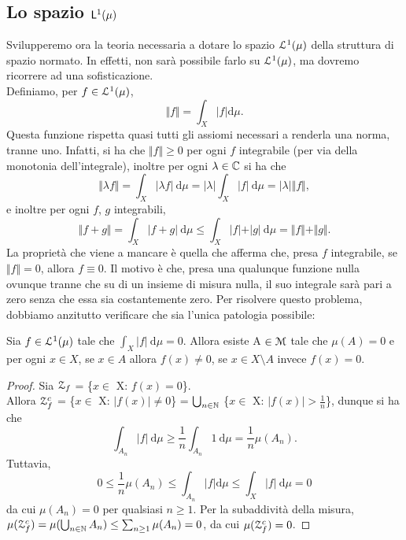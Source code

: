 \documentclass[Completo.tex]{subfiles}
\begin{document}
\subsection{Lo spazio $\sf[L]^1(\mu)$}
Svilupperemo ora la teoria necessaria a dotare lo spazio $\eu[L]^1(\mu)$ della struttura di spazio normato. In effetti, non sarà possibile farlo su $\eu[L]^1(\mu)$, ma dovremo ricorrere ad una sofisticazione. \\
Definiamo, per $f \in \eu[L]^1(\mu)$,
\begin{equation*}
\Vert f \Vert = \int_X \vert f \vert \mathrm{d}\mu.
\end{equation*}
Questa funzione rispetta quasi tutti gli assiomi necessari a renderla una norma, tranne uno. Infatti, si ha che $\Vert f \Vert \geq 0$ per ogni $f$ integrabile (per via della monotonia dell'integrale), inoltre per ogni $\lambda \in \bb[C]$ si ha che
\begin{equation*}
\Vert \lambda f \Vert = \int_X \vert \lambda f \vert \ \mathrm{d}\mu = \vert \lambda \vert \int_X \vert f \vert \ \mathrm{d}\mu = \vert \lambda \vert \Vert f \Vert,
\end{equation*}
e inoltre per ogni $f$, $g$ integrabili,
\begin{equation*}
\Vert f+g \Vert = \int_X \vert f+g \vert \ \mathrm{d}\mu \leq \int_X \vert f \vert + \vert g \vert \ \mathrm{d}\mu = \Vert f \Vert + \Vert g \Vert.
\end{equation*}
La proprietà che viene a mancare è quella che afferma che, presa $f$ integrabile, se $\Vert f \Vert = 0$, allora $f \equiv 0$. Il motivo è che, presa una qualunque funzione nulla ovunque tranne che su di un insieme di misura nulla, il suo integrale sarà pari a zero senza che essa sia costantemente zero. Per risolvere questo problema, dobbiamo anzitutto verificare che sia l'unica patologia possibile:
\begin{Prop}
	Sia $f \in \eu[L]^1(\mu)$ tale che $\int_X \vert f \vert \ \mathrm{d}\mu = 0$. Allora esiste A $\in \eu[M]$ tale che $\mu(A) = 0$ e per ogni $x \in X$, se $x \in A$ allora $f(x) \neq 0$, se $x \in X \setminus A$ invece $f(x) = 0$.
\end{Prop}
\begin{proof}
	Sia $\eu[Z]_f$ = \{$x \in$ X: $f(x) = 0$\}. \\
	Allora $\eu[Z]_f^{c}$ = \{$x \in$ X: $\vert f(x) \vert \neq 0$\} = $\bigcup_{n \in \bb[N]}$ \{$x \in$ X: $\vert f(x) \vert > \frac{1}{n}$\}, dunque si ha che
	\begin{equation*}
	\int_{A_n} \vert f \vert \ \mathrm{d}\mu \geq \frac{1}{n} \int_{A_n} 1 \ \mathrm{d}\mu = \frac{1}{n} \mu(A_n).
	\end{equation*}
	Tuttavia,
	\begin{equation*}
	0 \leq \frac{1}{n} \mu(A_n) \leq \int_{A_n} \vert f \vert \mathrm{d}\mu \leq \int_X \vert f \vert \ \mathrm{d}\mu = 0
	\end{equation*}
	da cui $\mu(A_n) = 0$ per qualsiasi $n \geq 1$. Per la subaddività della misura, $\mu(\eu[Z]_f^{c}) = \mu(\bigcup_{n \in \bb[N]}A_n) \leq \sum_{n\geq 1} \mu(A_n) = 0$, da cui $\mu(\eu[Z]_f^{c}) = 0$.
\end{proof}
\end{document}

